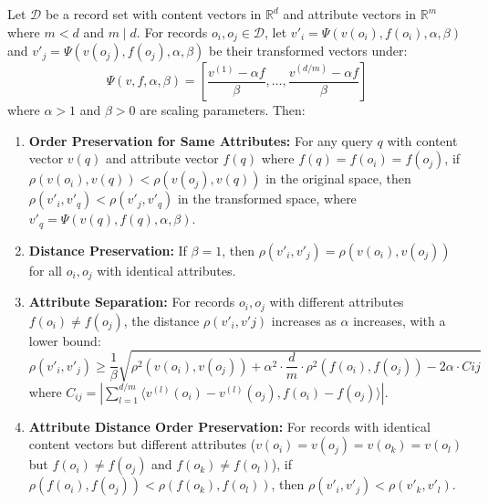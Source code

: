 \documentclass[10pt,a4paper]{amsart}
\begin{document}
\begin{theorem}
\label{theo:psi_property}
Let $\mathcal{D}$ be a record set with content vectors in $\mathbb{R}^d$ and attribute vectors in $\mathbb{R}^m$ where $m < d$ and $m \mid d$. For records $o_i, o_j \in \mathcal{D}$, let $v'_i = \Psi(v(o_i), f(o_i), \alpha, \beta)$ and $v'_j = \Psi(v(o_j), f(o_j), \alpha, \beta)$ be their transformed vectors under:
\begin{equation}
\Psi(v, f, \alpha, \beta) = \left[\frac{v^{(1)} - \alpha f}{\beta}, \ldots, \frac{v^{(d/m)} - \alpha f}{\beta}\right]
\end{equation}
where $\alpha > 1$ and $\beta > 0$ are scaling parameters. Then:

\begin{enumerate}[leftmargin=2em]
\item \textbf{Order Preservation for Same Attributes:} For any query $q$ with content vector $v(q)$ and attribute vector $f(q)$ where $f(q) = f(o_i) = f(o_j)$, if $\rho(v(o_i), v(q)) < \rho(v(o_j), v(q))$ in the original space, then $\rho(v'_i, v'_q) < \rho(v'_j, v'_q)$ in the transformed space, where $v'_q = \Psi(v(q), f(q), \alpha, \beta)$.

\item \textbf{Distance Preservation:} If $\beta = 1$, then $\rho(v'_i, v'_j) = \rho(v(o_i), v(o_j))$ for all $o_i, o_j$ with identical attributes.

\item \textbf{Attribute Separation:} For records $o_i, o_j$ with different attributes $f(o_i) \neq f(o_j)$, the distance $\rho(v'_i, v'j)$ increases as $\alpha$ increases, with a lower bound:
\begin{equation}
\rho(v'_i, v'_j) \geq \frac{1}{\beta}\sqrt{\rho^2(v(o_i), v(o_j)) + \alpha^2 \cdot \frac{d}{m} \cdot \rho^2(f(o_i), f(o_j)) - 2\alpha \cdot C{ij}}
\end{equation}
where $C_{ij} = |\sum_{l=1}^{d/m} \langle v^{(l)}(o_i) - v^{(l)}(o_j), f(o_i) - f(o_j) \rangle|$.

\item \textbf{Attribute Distance Order Preservation:} For records with identical content vectors but different attributes ($v(o_i) = v(o_j) = v(o_k) = v(o_l)$ but $f(o_i) \neq f(o_j)$ and $f(o_k) \neq f(o_l)$), if $\rho(f(o_i), f(o_j)) < \rho(f(o_k), f(o_l))$, then $\rho(v'_i, v'_j) < \rho(v'_k, v'_l)$.
\end{enumerate}
\end{theorem}
\end{document}
